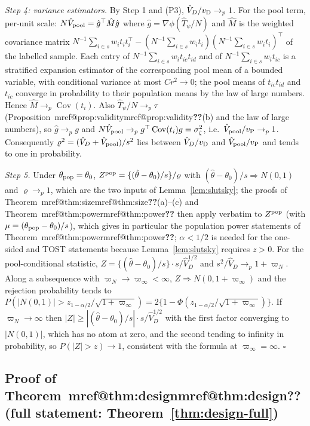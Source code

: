\documentclass[pdflatex,sn-mathphys-num,iicol]{sn-jnl}
\makeatletter
\theoremstyle{thmstyleone}
\theoremstyle{thmstyletwo}
\theoremstyle{thmstylethree}
\newcommand{\Mref}[1]{\ifcsname mref@#1\endcsname\csname mref@#1\endcsname\else\textbf{??}\fi}
\makeatother
\begin{document}
\emph{Step 4: variance estimators.} By Step 1 and (P3), $\hat V_D/v_{\rm D}\to_p1$. For the pool term, per-unit scale: $N\hat V_{\rm pool}=\hat g^\top\hat M\hat g$ where $\hat g=\nabla\phi(\hat T_\psi/N)$ and $\hat M$ is the weighted covariance matrix $N^{-1}\sum_{i\in s}w_it_it_i^\top-(N^{-1}\sum_{i\in s}w_it_i)(N^{-1}\sum_{i\in s}w_it_i)^\top$ of the labelled sample. Each entry of $N^{-1}\sum_{i\in s}w_it_{ic}t_{id}$ and of $N^{-1}\sum_{i\in s}w_it_{ic}$ is a stratified expansion estimator of the corresponding pool mean of a bounded variable, with conditional variance at most $Cr^2\to0$; the pool means of $t_{ic}t_{id}$ and $t_{ic}$ converge in probability to their population means by the law of large numbers. Hence $\hat M\to_p\operatorname{Cov}(t_i)$. Also $\hat T_\psi/N\to_p\tau$ (Proposition~\Mref{prop:validity}(b) and the law of large numbers), so $\hat g\to_pg$ and $N\hat V_{\rm pool}\to_pg^\top\operatorname{Cov}(t_i)g=\sigma^2_\zeta$, i.e.\ $\hat V_{\rm pool}/v_{\rm P}\to_p1$. Consequently $\varrho^2=(\hat V_D+\hat V_{\rm pool})/s^2$ lies between $\hat V_D/v_{\rm D}$ and $\hat V_{\rm pool}/v_{\rm P}$ and tends to one in probability.

\emph{Step 5.} Under $\theta_{\rm pop}=\theta_0$, $Z^{\rm pop}=\{(\hat\theta-\theta_0)/s\}/\varrho$ with $(\hat\theta-\theta_0)/s\Rightarrow N(0,1)$ and $\varrho\to_p1$, which are the two inputs of Lemma~\ref{lem:slutsky}; the proofs of Theorem~\Mref{thm:size}(a)--(c) and Theorem~\Mref{thm:power} then apply verbatim to $Z^{\rm pop}$ (with $\mu=(\theta_{\rm pop}-\theta_0)/s$), which gives in particular the population power statements of Theorem~\Mref{thm:power}; $\alpha<1/2$ is needed for the one-sided and TOST statements because Lemma~\ref{lem:slutsky} requires $z>0$. For the pool-conditional statistic, $Z=\{(\hat\theta-\theta_0)/s\}\cdot s/\hat V_D^{1/2}$ and $s^2/\hat V_D\to_p1+\varpi_N$. Along a subsequence with $\varpi_N\to\varpi_\infty<\infty$, $Z\Rightarrow N(0,1+\varpi_\infty)$ and the rejection probability tends to $P(|N(0,1)|>z_{1-\alpha/2}/\sqrt{1+\varpi_\infty})=2\{1-\Phi(z_{1-\alpha/2}/\sqrt{1+\varpi_\infty})\}$. If $\varpi_N\to\infty$ then $|Z|\ge|(\hat\theta-\theta_0)/s|\cdot s/\hat V_D^{1/2}$ with the first factor converging to $|N(0,1)|$, which has no atom at zero, and the second tending to infinity in probability, so $P(|Z|>z)\to1$, consistent with the formula at $\varpi_\infty=\infty$. $\square$

\subsection{Proof of Theorem~\Mref{thm:design} (full statement: Theorem~\ref{thm:design-full})}\label{si:testing-design}
\end{document}
